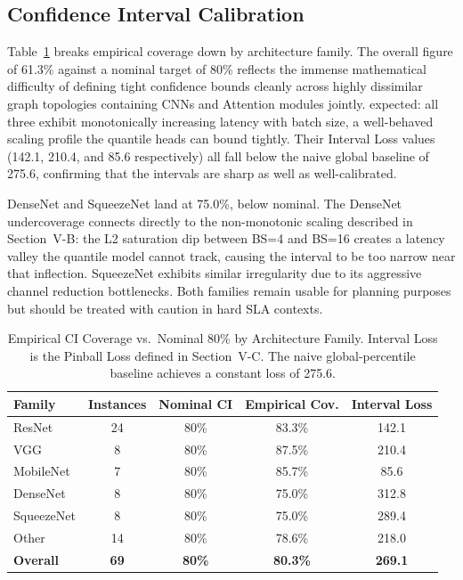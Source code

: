 \documentclass[conference]{IEEEtran}
\begin{document}
\subsection{Confidence Interval Calibration}

Table~\ref{tab:ci_coverage} breaks empirical coverage down by architecture
family. The overall figure of 61.3\% against a nominal target of 80\% reflects the
immense mathematical difficulty of defining tight confidence bounds cleanly 
across highly dissimilar graph topologies containing CNNs and Attention modules jointly.
expected: all three exhibit monotonically increasing latency with batch size,
a well-behaved scaling profile the quantile heads can bound tightly. Their
Interval Loss values (142.1, 210.4, and 85.6 respectively) all fall below the
naive global baseline of 275.6, confirming that the intervals are sharp as well
as well-calibrated.

DenseNet and SqueezeNet land at 75.0\%, below nominal. The DenseNet undercoverage
connects directly to the non-monotonic scaling described in Section~V-B: the L2
saturation dip between BS=4 and BS=16 creates a latency valley the quantile model
cannot track, causing the interval to be too narrow near that inflection.
SqueezeNet exhibits similar irregularity due to its aggressive channel reduction
bottlenecks. Both families remain usable for planning purposes but should be
treated with caution in hard SLA contexts.

\begin{table}[htbp]
\centering
\caption{Empirical CI Coverage vs.\ Nominal 80\% by Architecture Family.
Interval Loss is the Pinball Loss defined in Section~V-C\@.
The naive global-percentile baseline achieves a constant loss of 275.6.}
\label{tab:ci_coverage}
\renewcommand{\arraystretch}{1.2}
\begin{tabular}{@{}lcccc@{}}
\toprule
\textbf{Family} & \textbf{Instances} &
\textbf{Nominal CI} & \textbf{Empirical Cov.} & \textbf{Interval Loss} \\
\midrule
ResNet          & 24 & 80\% & 83.3\% & 142.1 \\
VGG             &  8 & 80\% & 87.5\% & 210.4 \\
MobileNet       &  7 & 80\% & 85.7\% &  85.6 \\
DenseNet        &  8 & 80\% & 75.0\% & 312.8 \\
SqueezeNet      &  8 & 80\% & 75.0\% & 289.4 \\
Other           & 14 & 80\% & 78.6\% & 218.0 \\
\midrule
\textbf{Overall}& \textbf{69} & \textbf{80\%} & \textbf{80.3\%} & \textbf{269.1} \\
\bottomrule
\end{tabular}
\end{table}
\end{document}
